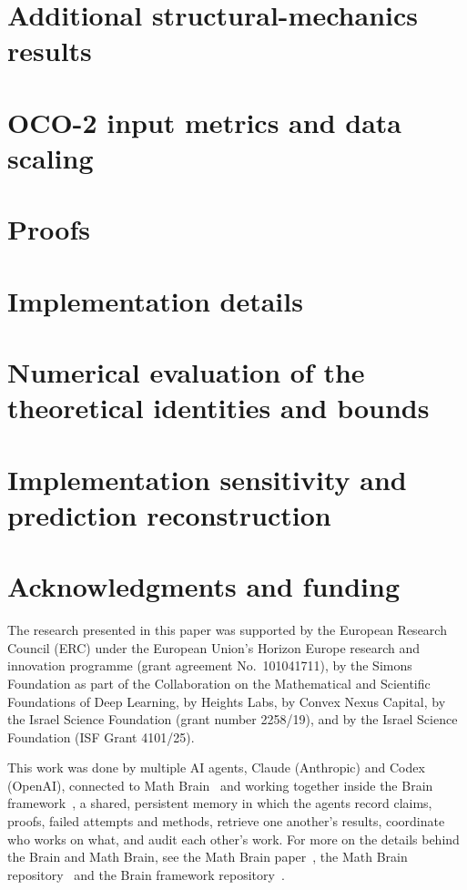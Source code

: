 \documentclass[twoside,11pt]{article}
\numberwithin{theorem}{section}
\numberwithin{equation}{section}
\numberwithin{figure}{section}
\numberwithin{table}{section}
\begin{document}
\section{Additional structural-mechanics results}
\label{supp:experiments}


\section{OCO-2 input metrics and data scaling}
\label{supp:oco2}


\section{Proofs}
\label{app:proofs}


\section{Implementation details}
\label{app:impl}


\section{Numerical evaluation of the theoretical identities and bounds}
\label{app:verification}


\section{Implementation sensitivity and prediction reconstruction}
\label{supp:sensitivity}


\section*{Acknowledgments and funding}
The research presented in this paper was supported by the European Research
Council (ERC) under the European Union's Horizon Europe research and innovation
programme (grant agreement No.~101041711), by the Simons Foundation as part
of the Collaboration on the Mathematical and Scientific Foundations of Deep
Learning, by Heights Labs, by Convex Nexus Capital, by the Israel Science
Foundation (grant number 2258/19), and by the Israel Science Foundation (ISF
Grant 4101/25).

This work was done by multiple AI agents, Claude (Anthropic) and Codex (OpenAI), connected to Math Brain~\citep{MathBrainRepo} and working together inside the Brain framework~\citep{BrainFramework}, a shared, persistent memory in which the agents record claims, proofs, failed attempts and methods, retrieve one another's results, coordinate who works on what, and audit each other's work. For more on the details behind the Brain and Math Brain, see the Math Brain paper~\citep{MathBrainPaper}, the Math Brain repository~\citep{MathBrainRepo} and the Brain framework repository~\citep{BrainFramework}.
\end{document}
